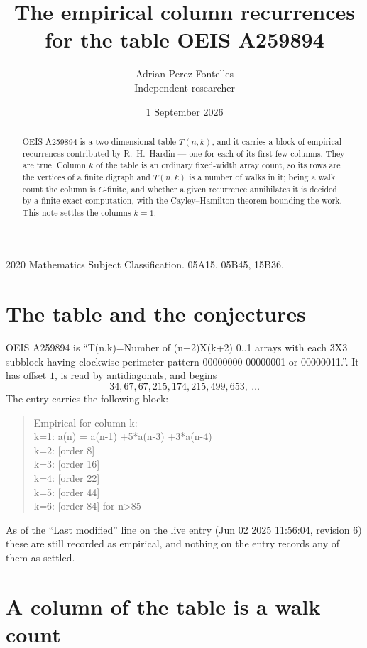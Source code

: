 \documentclass[11pt,a4paper]{article}
\title{The empirical column recurrences for the table OEIS A259894}
\author{Adrian Perez Fontelles\\ \small Independent researcher}
\date{1 September 2026}
\theoremstyle{plain}
\theoremstyle{definition}
\begin{document}
\maketitle

\begin{abstract}
OEIS A259894 is a two-dimensional table $T(n,k)$, and it carries a block of empirical
recurrences contributed by R.~H.~Hardin --- one for each of its first few columns. They are
true. Column $k$ of the table is an ordinary fixed-width array count, so its rows are the
vertices of a finite digraph and $T(n,k)$ is a number of walks in it; being a walk count the
column is $C$-finite, and whether a given recurrence annihilates it is decided by a finite
exact computation, with the Cayley--Hamilton theorem bounding the work. This note settles the columns $k=1$.
\end{abstract}

\noindent\small 2020 Mathematics Subject Classification. 05A15, 05B45, 15B36.\normalsize

\section{The table and the conjectures}

OEIS A259894 is ``T(n,k)=Number of (n+2)X(k+2) 0..1 arrays with each 3X3 subblock having clockwise perimeter pattern 00000000 00000001 or 00000011.''. It has offset $1$, is
read by antidiagonals, and begins
\[
34, 67, 67, 215, 174, 215, 499, 653,\ \dots
\]
The entry carries the following block:
\begin{quote}\small
Empirical for column k:\\
k=1: a(n) = a(n-1) +5*a(n-3) +3*a(n-4)\\
k=2: [order 8]\\
k=3: [order 16]\\
k=4: [order 22]\\
k=5: [order 44]\\
k=6: [order 84] for n>85\\
\end{quote}
As of the ``Last modified'' line on the live entry (Jun 02 2025 11:56:04, revision 6) these are still
recorded as empirical, and nothing on the entry records any of them as settled.

\section{A column of the table is a walk count}
\end{document}
